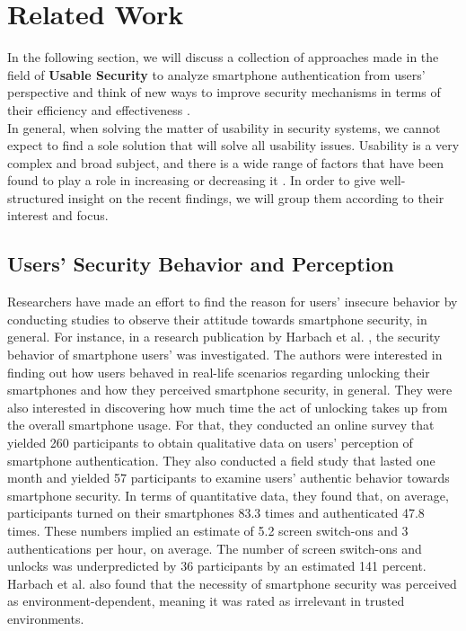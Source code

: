 \section{Related Work}

In the following section, we will discuss a collection of approaches made in the field of \textbf{Usable Security} to analyze smartphone authentication from users' perspective and think of new ways to improve security mechanisms in terms of their efficiency and effectiveness \cite{anonymous}. \\

In general, when solving the matter of usability in security systems, we cannot expect to find a sole solution that will solve all usability issues. Usability is a very complex and broad subject, and there is a wide range of factors that have been found to play a role in increasing or decreasing it \cite{anonymous,harbach,Albayram:2017:BUL:3235924.3235929, AnatomySmartphone}. In order to give well-structured insight on the recent findings, we will group them according to their interest and focus.

\subsection{Users' Security Behavior and Perception} \label{2.2.1}

Researchers have made an effort to find the reason for users' insecure behavior by conducting studies to observe their attitude towards smartphone security, in general. For instance, in a research publication by Harbach et al. \cite{harbach}, the security behavior of smartphone users' was investigated. The authors were interested in finding out how users behaved in real-life scenarios regarding unlocking their smartphones and how they perceived smartphone security, in general. They were also interested in discovering how much time the act of unlocking takes up from the overall smartphone usage. For that, they conducted an online survey that yielded 260 participants to obtain qualitative data on users' perception of smartphone authentication. They also conducted a field study that lasted one month and yielded 57 participants to examine users' authentic behavior towards smartphone security. In terms of quantitative data, they found that, on average, participants turned on their smartphones 83.3 times and authenticated 47.8 times. These numbers implied an estimate of 5.2 screen switch-ons and 3 authentications per hour, on average. The number of screen switch-ons and unlocks was underpredicted by 36 participants by an estimated 141 percent. Harbach et al. \cite{harbach} also found that the necessity of smartphone security was perceived as environment-dependent, meaning it was rated as irrelevant in trusted environments.\\

